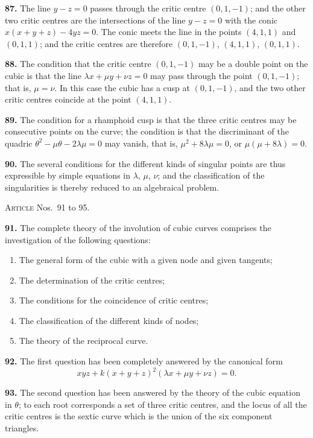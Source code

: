 \documentclass[11pt,a4paper]{article}
\theoremstyle{plain}
\theoremstyle{definition}
\begin{document}
\textbf{87.} The line $y - z = 0$ passes through the critic centre $(0, 1, -1)$; and the other two critic centres are the intersections of the line $y - z = 0$ with the conic $x(x + y + z) - 4yz = 0$. The conic meets the line in the points $(4, 1, 1)$ and $(0, 1, 1)$; and the critic centres are therefore $(0, 1, -1)$, $(4, 1, 1)$, $(0, 1, 1)$.

\textbf{88.} The condition that the critic centre $(0, 1, -1)$ may be a double point on the cubic is that the line $\lambda x + \mu y + \nu z = 0$ may pass through the point $(0, 1, -1)$; that is, $\mu = \nu$. In this case the cubic has a cusp at $(0, 1, -1)$, and the two other critic centres coincide at the point $(4, 1, 1)$.

\textbf{89.} The condition for a rhamphoid cusp is that the three critic centres may be consecutive points on the curve; the condition is that the discriminant of the quadric $\theta^2 - \mu\theta - 2\lambda\mu = 0$ may vanish, that is, $\mu^2 + 8\lambda\mu = 0$, or $\mu(\mu + 8\lambda) = 0$.

\textbf{90.} The several conditions for the different kinds of singular points are thus expressible by simple equations in $\lambda$, $\mu$, $\nu$; and the classification of the singularities is thereby reduced to an algebraical problem.

\bigskip

\noindent\textsc{Article} Nos.~91 to 95.

\medskip

\textbf{91.} The complete theory of the involution of cubic curves comprises the investigation of the following questions:
\begin{enumerate}[label=(\arabic*)]
\item The general form of the cubic with a given node and given tangents;
\item The determination of the critic centres;
\item The conditions for the coincidence of critic centres;
\item The classification of the different kinds of nodes;
\item The theory of the reciprocal curve.
\end{enumerate}

\textbf{92.} The first question has been completely answered by the canonical form
\[
xyz + k(x + y + z)^2(\lambda x + \mu y + \nu z) = 0.
\]

\textbf{93.} The second question has been answered by the theory of the cubic equation in $\theta$; to each root corresponds a set of three critic centres, and the locus of all the critic centres is the sextic curve which is the union of the six component triangles.
\end{document}
